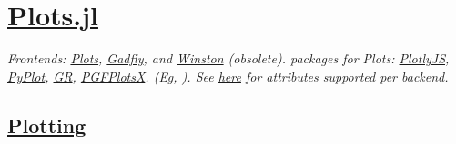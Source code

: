 \section{\href{https://docs.juliaplots.org/latest/input\_data/}{Plots.jl}}

\textit{Frontends: \href{http://docs.juliaplots.org/latest/}{Plots}, \href{http://gadflyjl.org/stable/}{Gadfly}, and \href{https://github.com/JuliaGraphics/Winston.jl}{Winston} (obsolete).  packages for Plots: \href{https://github.com/plotly/Plotly.jl}{PlotlyJS}, \href{https://github.com/JuliaPy/PyPlot.jl}{PyPlot}, \href{https://github.com/jheinen/GR.jl}{GR}, \href{https://kristofferc.github.io/PGFPlotsX.jl/stable/}{PGFPlotsX}. (Eg, \texttt{}). See \href{https://docs.juliaplots.org/latest/generated/supported/}{here} for attributes supported per backend.}


\subsection*{\href{http://docs.juliaplots.org/latest/}{Plotting}}
\\
\\
\\
\\
\\
 \\
\\
\\
 \\
\\



